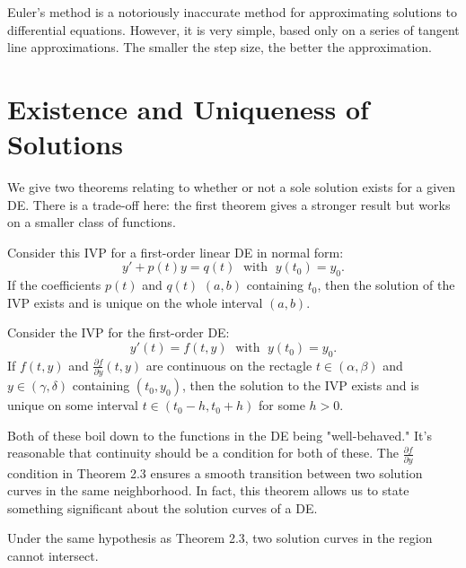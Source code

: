\documentclass[../m82main.tex]{subfiles}
\begin{document}
Euler's method is a notoriously inaccurate method for approximating solutions to differential equations.
However, it is very simple, based only on a series of tangent line approximations.
The smaller the step size, the better the approximation.

\section{Existence and Uniqueness of Solutions}
We give two theorems relating to whether or not a sole solution exists for a given DE.
There is a trade-off here: the first theorem gives a stronger result but works on a smaller class of functions.

\begin{theorem}
    Consider this IVP for a first-order linear DE in normal form:
    \[ y' + p(t)y = q(t) \;\text{ with }\; y(t_0) = y_0. \]
    If the coefficients $p(t)$ and $q(t)$  $(a, b)$ containing $t_0$, then the solution of the IVP exists and is unique on the whole interval $(a, b)$.
\end{theorem}

\begin{theorem}
    Consider the IVP for the first-order DE:
    \[ y'(t) = f(t, y) \;\text{ with }\; y(t_0) = y_0. \]
    If $f(t, y)$ and $\frac{\partial f}{\partial y}(t, y)$ are continuous on the rectagle $t \in (\alpha, \beta)$ and $y \in (\gamma, \delta)$ containing $(t_0, y_0)$, then the solution to the IVP exists and is unique on some interval $t \in (t_0 - h, t_0 + h)$ for some $h > 0$.
\end{theorem}

Both of these boil down to the functions in the DE being "well-behaved."
It's reasonable that continuity should be a condition for both of these.
The $\frac{\partial f}{\partial y}$ condition in Theorem 2.3 ensures a smooth transition between two solution curves in the same neighborhood.
In fact, this theorem allows us to state something significant about the solution curves of a DE.

\begin{corollary}
    Under the same hypothesis as Theorem 2.3, two solution curves in the region cannot intersect.
\end{corollary}
\end{document}
